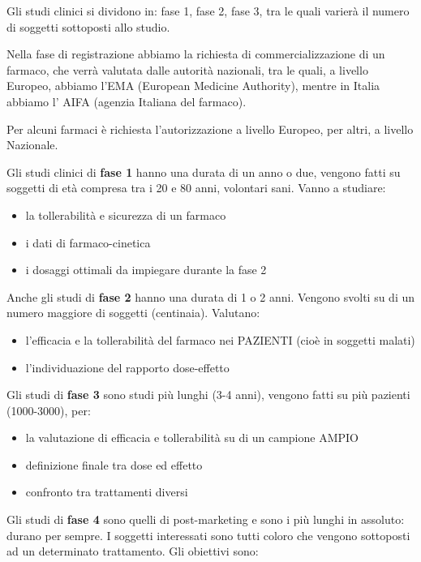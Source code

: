 Gli studi clinici si dividono in: fase 1, fase 2, fase 3, tra le quali
varierà il numero di soggetti sottoposti allo studio.

Nella fase di registrazione abbiamo la richiesta di commercializzazione
di un farmaco, che verrà valutata dalle autorità nazionali, tra le
quali, a livello Europeo, abbiamo l'EMA (European Medicine Authority),
mentre in Italia abbiamo l' AIFA (agenzia Italiana del farmaco).

Per alcuni farmaci è richiesta l'autorizzazione a livello Europeo, per
altri, a livello Nazionale.

Gli studi clinici di \textbf{fase 1} hanno una durata di un anno o due,
vengono fatti su soggetti di età compresa tra i 20 e 80 anni, volontari
sani. Vanno a studiare:

\begin{itemize}
\item
  la tollerabilità e sicurezza di un farmaco
\item
  i dati di farmaco-cinetica
\item
  i dosaggi ottimali da impiegare durante la fase 2
\end{itemize}

Anche gli studi di \textbf{fase 2} hanno una durata di 1 o 2 anni.
Vengono svolti su di un numero maggiore di soggetti (centinaia).
Valutano:

\begin{itemize}
\item
  l'efficacia e la tollerabilità del farmaco nei PAZIENTI (cioè in
  soggetti malati)
\item
  l'individuazione del rapporto dose-effetto
\end{itemize}

Gli studi di \textbf{fase 3} sono studi più lunghi (3-4 anni), vengono
fatti su più pazienti (1000-3000), per:

\begin{itemize}
\item
  la valutazione di efficacia e tollerabilità su di un campione AMPIO
\item
  definizione finale tra dose ed effetto
\item
  confronto tra trattamenti diversi
\end{itemize}

Gli studi di \textbf{fase 4} sono quelli di post-marketing e sono i più
lunghi in assoluto: durano per sempre. I soggetti interessati sono tutti
coloro che vengono sottoposti ad un determinato trattamento. Gli
obiettivi sono:

